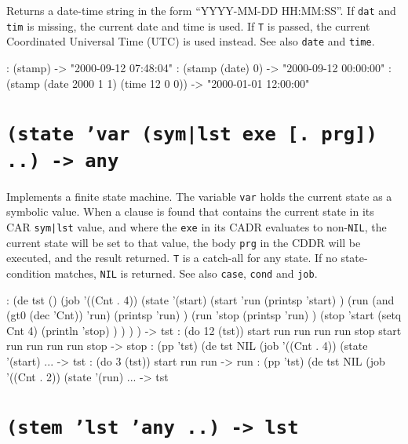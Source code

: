 Returns a date-time string in the form ``YYYY-MM-DD HH:MM:SS''. If \texttt{dat}
and \texttt{tim} is missing, the current date and time is used. If \texttt{T} is
passed, the current Coordinated Universal Time (UTC) is used instead.
See also \texttt{date} and \texttt{time}.


\begin{wideverbatim}
: (stamp)
-> "2000-09-12 07:48:04"
: (stamp (date) 0)
-> "2000-09-12 00:00:00"
: (stamp (date 2000 1 1) (time 12 0 0))
-> "2000-01-01 12:00:00"
\end{wideverbatim}

 
\section*{\texttt{(state 'var (sym|lst exe [. prg]) ..) -> any}}
\label{sec:func-ref-S-(state 'var (sym|lst exe [. prg]) ..) -> any}


Implements a finite state machine. The variable \texttt{var} holds the current
state as a symbolic value. When a clause is found that contains the
current state in its CAR \texttt{sym|lst} value, and where the \texttt{exe} in its
CADR evaluates to non-\texttt{NIL}, the current state will be set to that
value, the body \texttt{prg} in the CDDR will be executed, and the result
returned. \texttt{T} is a catch-all for any state. If no state-condition
matches, \texttt{NIL} is returned. See also \texttt{case}, \texttt{cond} and \texttt{job}.


\begin{wideverbatim}
: (de tst ()
   (job '((Cnt . 4))
      (state '(start)
         (start 'run
            (printsp 'start) )
         (run (and (gt0 (dec 'Cnt)) 'run)
            (printsp 'run) )
         (run 'stop
            (printsp 'run) )
         (stop 'start
            (setq Cnt 4)
            (println 'stop) ) ) ) )
-> tst
: (do 12 (tst))
start run run run run stop
start run run run run stop
-> stop
: (pp 'tst)
(de tst NIL
   (job '((Cnt . 4))
      (state '(start)
      ...
-> tst
: (do 3 (tst))
start run run -> run
: (pp 'tst)
(de tst NIL
   (job '((Cnt . 2))
      (state '(run)
      ...
-> tst
\end{wideverbatim}

 
\section*{\texttt{(stem 'lst 'any ..) -> lst}}
\label{sec:func-ref-S-(stem 'lst 'any ..) -> lst}



